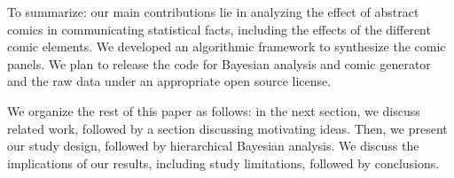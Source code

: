 To summarize: our main contributions lie in analyzing the effect of abstract comics in communicating statistical facts, including the effects of the different comic elements. We developed an algorithmic framework to synthesize the comic panels. We plan to release the code for Bayesian analysis and comic generator and the raw data under an appropriate open source license.

We organize the rest of this paper as follows: in the next section, we discuss related work, followed by a section discussing motivating ideas. Then, we present our study design, followed by hierarchical Bayesian analysis. We discuss the implications of our results, including study limitations, followed by conclusions.
